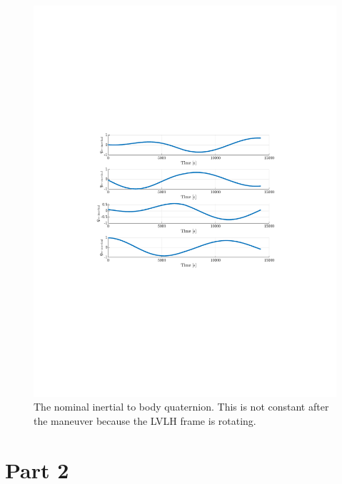 \documentclass[]{article}
\begin{document}
\begin{figure}[!h]
	\centering
	\includegraphics[width=\linewidth,trim={4cm, 8cm, 4cm, 8cm},clip]{figs/P1Q4.pdf}
	\caption{The nominal inertial to body quaternion. This is not constant after the maneuver because the LVLH frame is rotating.}
	\label{fig:P1Q4}
\end{figure}

\section{Part 2}
\end{document}
